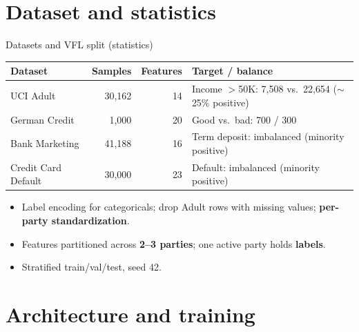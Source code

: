 \documentclass[aspectratio=169, 11pt]{beamer}
\begin{document}
\section{Dataset and statistics}

\begin{frame}{Datasets and VFL split (statistics)}
  \begin{center}
  \small
  \begin{tabular}{@{}lrrp{4.6cm}@{}}
    \toprule
    \textbf{Dataset} & \textbf{Samples} & \textbf{Features} & \textbf{Target / balance} \\
    \midrule
    UCI Adult & 30{,}162 & 14 & Income $>$50K: 7{,}508 vs.\ 22{,}654 ($\sim$25\% positive) \\
    German Credit & 1{,}000 & 20 & Good vs.\ bad: 700 / 300 \\
    Bank Marketing & 41{,}188 & 16 & Term deposit: imbalanced (minority positive) \\
    Credit Card Default & 30{,}000 & 23 & Default: imbalanced (minority positive) \\
    \bottomrule
  \end{tabular}
  \end{center}
  \vspace{0.45em}
  \begin{itemize}
    \item Label encoding for categoricals; drop Adult rows with missing values; \textbf{per-party standardization}.
    \item Features partitioned across \textbf{2--3 parties}; one active party holds \textbf{labels}.
    \item Stratified train/val/test, seed 42.
  \end{itemize}
\end{frame}

\section{Architecture and training}
\end{document}
